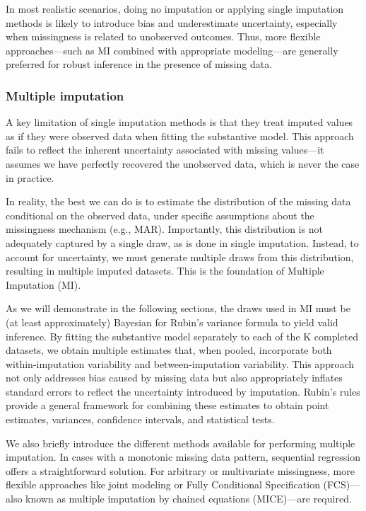 \documentclass{article}
\begin{document}
In most realistic scenarios, doing no imputation or applying single
imputation methods is likely to introduce bias and underestimate
uncertainty, especially when missingness is related to unobserved
outcomes. Thus, more flexible approaches---such as MI combined with
appropriate modeling---are generally preferred for robust inference in
the presence of missing data.

\subsubsection{Multiple imputation}\label{multiple-imputation}

A key limitation of single imputation methods is that they treat imputed
values as if they were observed data when fitting the substantive model.
This approach fails to reflect the inherent uncertainty associated with
missing values---it assumes we have perfectly recovered the unobserved
data, which is never the case in practice.

In reality, the best we can do is to estimate the distribution of the
missing data conditional on the observed data, under specific
assumptions about the missingness mechanism (e.g., MAR). Importantly,
this distribution is not adequately captured by a single draw, as is
done in single imputation. Instead, to account for uncertainty, we must
generate multiple draws from this distribution, resulting in multiple
imputed datasets. This is the foundation of Multiple Imputation (MI).

As we will demonstrate in the following sections, the draws used in MI
must be (at least approximately) Bayesian for Rubin's variance formula
to yield valid inference. By fitting the substantive model separately to
each of the K completed datasets, we obtain multiple estimates that,
when pooled, incorporate both within-imputation variability and
between-imputation variability. This approach not only addresses bias
caused by missing data but also appropriately inflates standard errors
to reflect the uncertainty introduced by imputation. Rubin's rules
provide a general framework for combining these estimates to obtain
point estimates, variances, confidence intervals, and statistical tests.

We also briefly introduce the different methods available for performing
multiple imputation. In cases with a monotonic missing data pattern,
sequential regression offers a straightforward solution. For arbitrary
or multivariate missingness, more flexible approaches like joint
modeling or Fully Conditional Specification (FCS)---also known as
multiple imputation by chained equations (MICE)---are required.
\end{document}
